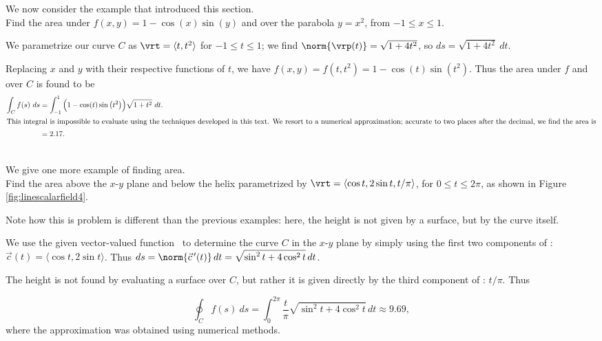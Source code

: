 We now consider the example that introduced this section.\\

{Find the area under $f(x,y) = 1-\cos(x)\sin(y)$ and over the parabola $y = x^2$, from $-1\leq x\leq 1$. }
{We parametrize our curve $C$ as $\vrt = \langle t,t^2\rangle$ for $-1\leq t\leq 1$; we find $\norm{\vrp(t)} = \sqrt{1+4t^2}$, so $ds = \sqrt{1+4t^2}\ dt$. 

Replacing $x$ and $y$ with their respective functions of $t$, we have $f(x,y) = f(t,t^2) = 1-\cos(t)\sin(t^2)$. Thus the area under $f$ and over $C$ is found to be
\begin{align*}
\int_C f(s)\ ds &= \int_{-1}^1 \Big(1-\cos(t)\sin\big(t^2\big)\Big)\sqrt{1+t^2}\ dt.\\
\intertext{This integral is impossible to evaluate using the techniques developed in this text. We resort to a numerical approximation; accurate to two places after the decimal, we find the area is}
 &= 2.17.
\end{align*}
}\\

We give one more example of finding area.\\

{Find the area above the $x$-$y$ plane and below the helix parametrized by $\vrt = \langle \cos t,2\sin t,t/\pi\rangle$, for $0\leq t\leq 2\pi$, as shown in Figure \ref{fig:linescalarfield4}.}
{Note how this is problem is different than the previous examples: here, the height is not given by a surface, but by the curve itself. 

We use the given vector-valued function \vrt\ to determine the curve $C$ in the $x$-$y$ plane by simply using the first two components of \vrt: $\vec c(t) = \langle \cos t,2\sin t\rangle$. Thus $ds = \norm{\vec c\,'(t)}\,dt = \sqrt{\sin^2t + 4\cos^2t}\,dt$. 

The height is not found by evaluating a surface over $C$, but rather it is given directly by the third component of \vrt: $t/\pi$. Thus

$$\oint_C f(s)\ ds = \int_0^{2\pi} \frac{t}{\pi}\sqrt{\sin^2t + 4\cos^2t}\,dt \approx 9.69,$$
where the approximation was obtained using numerical methods.
}\\


